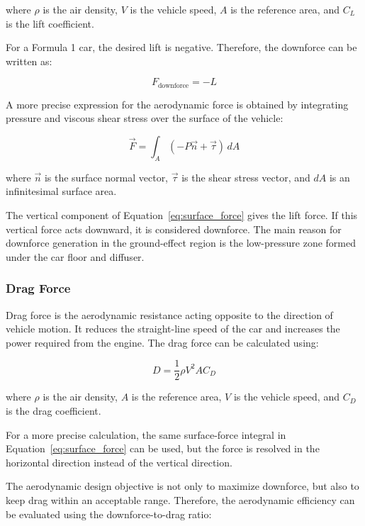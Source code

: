 \documentclass[12pt,a4paper]{article}
\begin{document}
where $\rho$ is the air density, $V$ is the vehicle speed, $A$ is the reference area, and
$C_L$ is the lift coefficient.

For a Formula 1 car, the desired lift is negative. Therefore, the downforce can be written as:

\begin{equation}
    F_{\text{downforce}} = -L
    \label{eq:downforce}
\end{equation}

A more precise expression for the aerodynamic force is obtained by integrating pressure
and viscous shear stress over the surface of the vehicle:

\begin{equation}
    \vec{F} = \int_A \left(-P \vec{n}  + \vec{\tau}  \right) \, dA
    \label{eq:surface_force}
\end{equation}

where $\vec{n}$ is the surface normal vector, $\vec{\tau}$ is the shear stress vector, and
$dA$ is an infinitesimal surface area.

The vertical component of Equation~\ref{eq:surface_force} gives the lift force. If this
vertical force acts downward, it is considered downforce. The main reason for downforce
generation in the ground-effect region is the low-pressure zone formed under the car floor
and diffuser.

\subsubsection{Drag Force}

Drag force is the aerodynamic resistance acting opposite to the direction of vehicle
motion. It reduces the straight-line speed of the car and increases the power required
from the engine. The drag force can be calculated using:

\begin{equation}
    D = \frac{1}{2}\rho V^2 A C_D
    \label{eq:drag_force}
\end{equation}

where $\rho$ is the air density, $A$ is the reference area, $V$ is the vehicle speed, and
$C_D$ is the drag coefficient.

For a more precise calculation, the same surface-force integral in
Equation~\ref{eq:surface_force} can be used, but the force is resolved in the horizontal
direction instead of the vertical direction.

The aerodynamic design objective is not only to maximize downforce, but also to keep
drag within an acceptable range. Therefore, the aerodynamic efficiency can be evaluated
using the downforce-to-drag ratio:
\end{document}
